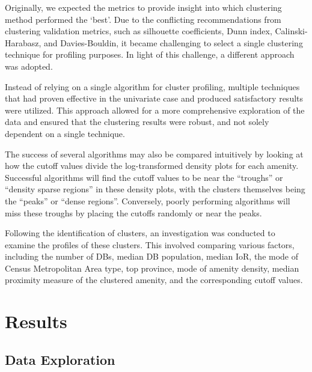 \documentclass[11pt, a4paper]{article}
\begin{document}
Originally, we expected the metrics to provide insight into which clustering method performed the `best'. Due to the conflicting recommendations from clustering validation metrics, such as silhouette coefficients, Dunn index, Calinski-Harabasz, and Davies-Bouldin, it became challenging to select a single clustering technique for profiling purposes. In light of this challenge, a different approach was adopted.
\par
Instead of relying on a single algorithm for cluster profiling, multiple techniques that had proven effective in the univariate case and produced satisfactory results were utilized. This approach allowed for a more comprehensive exploration of the data and ensured that the clustering results were robust, and not solely dependent on a single technique.
\par
The success of several algorithms may also be compared intuitively by looking at how the cutoff values divide the log-transformed density plots for each amenity. Successful algorithms will find the cutoff values to be near the ``troughs'' or “density sparse regions” in these density plots, with the clusters themselves being the ``peaks'' or ``dense regions''. Conversely, poorly performing algorithms will miss these troughs by placing the cutoffs randomly or near the peaks.
\par
Following the identification of clusters, an investigation was conducted to examine the profiles of these clusters. This involved comparing various factors, including the number of DBs, median DB population, median IoR, the mode of Census Metropolitan Area type, top province, mode of amenity density, median proximity measure of the clustered amenity, and the corresponding cutoff values.











\pagebreak
\section{Results}




\subsection{Data Exploration}
\end{document}
